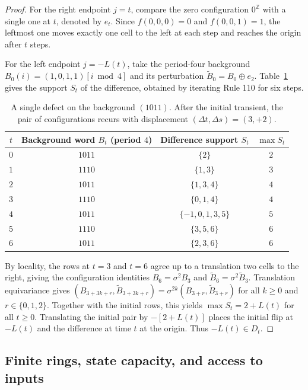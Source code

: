 \begin{proof}
For the right endpoint $j = t$, compare the zero configuration $0^{\mathbb{Z}}$ with a single one at $t$, denoted by $e_t$. Since $f(0, 0, 0) = 0$ and $f(0, 0, 1) = 1$, the leftmost one moves exactly one cell to the left at each step and reaches the origin after $t$ steps.

For the left endpoint $j = -L(t)$, take the period-four background $B_0(i) = (1, 0, 1, 1)[i \bmod 4]$ and its perturbation $\widetilde B_0 = B_0 \oplus e_2$. Table~\ref{tab:period4_defect} gives the support $S_t$ of the difference, obtained by iterating Rule 110 for six steps.

\begin{table}[h]
\centering
\caption{A single defect on the background $(1011)$. After the initial transient, the pair of configurations recurs with displacement $(\Delta t, \Delta s) = (3, +2)$.}
\label{tab:period4_defect}
\begin{tabular}{cccc}
\toprule
$t$ & Background word $B_t$ (period $4$) & Difference support $S_t$ & $\max S_t$ \\
\midrule
$0$ & $1011$ & $\{2\}$ & $2$ \\
$1$ & $1110$ & $\{1, 3\}$ & $3$ \\
$2$ & $1011$ & $\{1, 3, 4\}$ & $4$ \\
$3$ & $1110$ & $\{0, 1, 4\}$ & $4$ \\
$4$ & $1011$ & $\{-1, 0, 1, 3, 5\}$ & $5$ \\
$5$ & $1110$ & $\{3, 5, 6\}$ & $6$ \\
$6$ & $1011$ & $\{2, 3, 6\}$ & $6$ \\
\bottomrule
\end{tabular}
\end{table}

By locality, the rows at $t=3$ and $t=6$ agree up to a translation two cells to the right, giving the configuration identities $B_6 = \sigma^2 B_3$ and $\widetilde B_6 = \sigma^2 \widetilde B_3$. Translation equivariance gives $(B_{3+3k+r}, \widetilde B_{3+3k+r}) = \sigma^{2k}(B_{3+r}, \widetilde B_{3+r})$ for all $k \ge 0$ and $r \in \{0, 1, 2\}$. Together with the initial rows, this yields $\max S_t = 2 + L(t)$ for all $t \ge 0$. Translating the initial pair by $-[2 + L(t)]$ places the initial flip at $-L(t)$ and the difference at time $t$ at the origin. Thus $-L(t) \in D_t$.
\end{proof}

\subsection{Finite rings, state capacity, and access to inputs}

